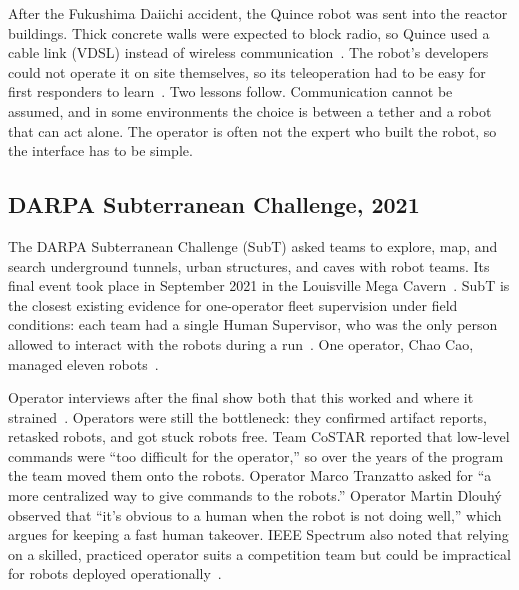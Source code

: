 After the Fukushima Daiichi accident, the Quince robot was sent into the reactor buildings.
Thick concrete walls were expected to block radio, so Quince used a cable link (VDSL) instead of wireless communication~\citep{nagatani2011fukushima}.
The robot's developers could not operate it on site themselves, so its teleoperation had to be easy for first responders to learn~\citep{nagatani2011fukushima}.
Two lessons follow.
Communication cannot be assumed, and in some environments the choice is between a tether and a robot that can act alone.
The operator is often not the expert who built the robot, so the interface has to be simple.

\subsection{DARPA Subterranean Challenge, 2021}

The DARPA Subterranean Challenge (SubT) asked teams to explore, map, and search underground tunnels, urban structures, and caves with robot teams.
Its final event took place in September 2021 in the Louisville Mega Cavern~\citep{darpa2021subt}.
SubT is the closest existing evidence for one-operator fleet supervision under field conditions: each team had a single Human Supervisor, who was the only person allowed to interact with the robots during a run~\citep{ackerman2021subtoperators}.
One operator, Chao Cao, managed eleven robots~\citep{ackerman2021subtoperators}.

Operator interviews after the final show both that this worked and where it strained~\citep{ackerman2021subtoperators}.
Operators were still the bottleneck: they confirmed artifact reports, retasked robots, and got stuck robots free.
Team CoSTAR reported that low-level commands were ``too difficult for the operator,'' so over the years of the program the team moved them onto the robots.
Operator Marco Tranzatto asked for ``a more centralized way to give commands to the robots.''
Operator Martin Dlouh\'y observed that ``it's obvious to a human when the robot is not doing well,'' which argues for keeping a fast human takeover.
IEEE Spectrum also noted that relying on a skilled, practiced operator suits a competition team but could be impractical for robots deployed operationally~\citep{ackerman2021subtoperators}.


